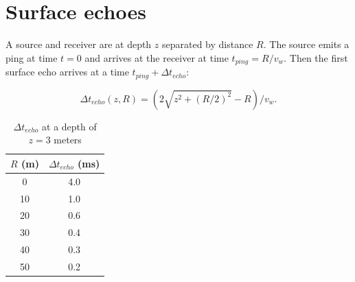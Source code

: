 \documentclass[10pt]{amsart}
\begin{document}
\section{Surface echoes}


A source and receiver are at depth \(z\) separated by distance \(R\).  The source emits a ping at time \(t=0\) and arrives at the receiver at time \(t_{ping}=R/v_w\).  Then the first surface echo arrives at a time \(t_{ping}+\Delta{t}_{echo}\):


\begin{equation*}
\Delta{t}_{echo}(z,R)=(2\sqrt{z^2+(R/2)^2}-R)/v_w.
\end{equation*}


\begin{table}[h]
\caption{\(\Delta{t}_{echo}\) at a depth of \(z=3\) meters}
\begin{tabular}{|c|c|}
\hline\hline
\(R\) (m) & \(\Delta{t}_{echo}\) (ms) \\
\hline
 0	& 4.0 \\
 10	& 1.0 \\
 20	& 0.6 \\
 30	& 0.4 \\
 40	& 0.3 \\
 50	& 0.2 \\
 \hline
\end{tabular}
\label{tab:SurfaceEchoes}
\end{table}


\end{document}
